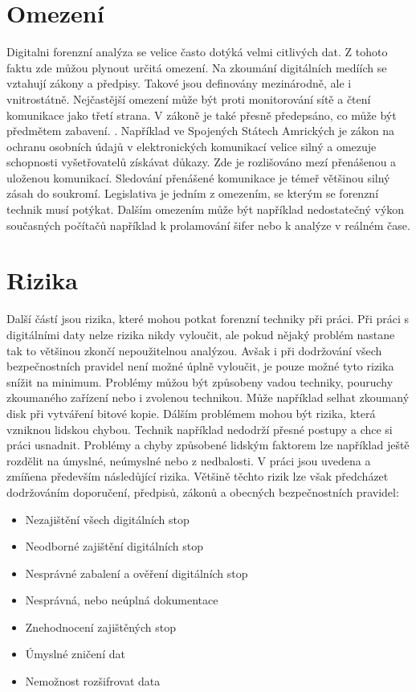 \documentclass[thesis=B,czech]{FITthesis}[2012/06/26]
\begin{document}
\section{Omezení}

Digitalni forenzní analýza se velice často dotýká velmi citlivých dat. Z tohoto faktu zde můžou plynout určitá omezení. Na zkoumání  digitálních medíích se vztahují zákony a předpisy. Takové jsou definovány mezinárodně, ale i vnitrostátně. Nejčastější omezení může být proti monitorování sítě a čtení komunikace jako třetí strana. V zákoně je také přesně předepsáno, co může být předmětem zabavení. \cite{for_wi}. Například ve Spojených Státech Amrických je zákon na ochranu osobních údajů v elektronických komunikací velice silný a omezuje schopnosti vyšetřovatelů získávat důkazy. Zde je rozlišováno mezí přenášenou a uloženou komunikací. Sledování přenášené komunikace je témeř většinou silný zásah do soukromí. Legislativa je jedním z omezením, se kterým se forenzní technik musí potýkat. Dalším omezením může být například nedostatečný výkon současných počítačů například k prolamování šifer nebo k analýze v reálném čase. 


\section{Rizika}
Další částí jsou rizika, které mohou potkat forenzní techniky při práci. Při práci s digitálními daty nelze rizika nikdy vyloučit, ale pokud nějaký problém nastane tak to většinou zkončí nepoužitelnou analýzou. Avšak i při dodržování všech bezpečnostních pravidel není možné úplně vyloučit, je pouze možné tyto rizika snížit na minimum. Problémy můžou být způsobeny vadou techniky, pouruchy zkoumaného zařízení nebo i zvolenou technikou. Může například selhat zkoumaný disk při vytváření bitové kopie. Dálším problémem mohou být rizika, která vzniknou lidskou chybou. Technik například nedodrží přesné postupy a chce si práci usnadnit. Problémy a chyby způsobené lidským faktorem lze například ještě rozdělit na úmyslné, neúmyslné nebo z nedbalosti. V práci \cite{for_baka} jsou uvedena a zmíňena především následůjící rizika. Většině těchto rizik lze však předcházet dodržováním doporučení, předpisů, zákonů a obecných bezpečnostních pravidel:

\begin{itemize}
\item Nezajištění všech digitálních stop
\item Neodborné zajištění digitálních stop
\item Nesprávné zabalení a ověření digitálních stop
\item Nesprávná, nebo neúplná dokumentace
\item Znehodnocení zajištěných stop
\item Úmyslné zničení dat
\item Nemožnost rozšifrovat data

\end{itemize}
\end{document}
